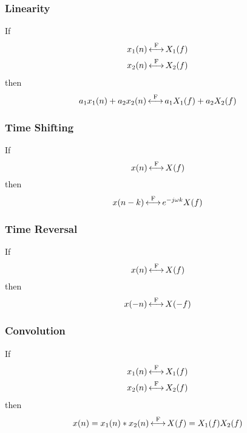 \subsubsection{Linearity}\label{subsubsec:FourierTransformProperties-Linearity}
If
\begin{equation*}
  \begin{aligned}
    x_{1}(n) &\operatorname{\overset{F}{\longleftrightarrow}} X_{1}(f) \\
    x_{2}(n) &\operatorname{\overset{F}{\longleftrightarrow}} X_{2}(f) \\
  \end{aligned}
\end{equation*}
then
\begin{equation}\label{eq:FourierTransformProperties-Linearity}
  a_{1}x_{1}(n) + a_{2}x_{2}(n) \operatorname{\overset{F}{\longleftrightarrow}} a_{1}X_{1}(f) + a_{2}X_{2}(f)
\end{equation}

\subsubsection{Time Shifting}\label{subsubsec:FourierTransformProperties-TimeShifting}
If
\begin{equation*}
  x(n) \operatorname{\overset{F}{\longleftrightarrow}} X(f)
\end{equation*}
then
\begin{equation}\label{eq:FourierTransformProperties-TimeShifting}
  x(n-k) \operatorname{\overset{F}{\longleftrightarrow}} e^{-j \omega k} X(f)
\end{equation}

\subsubsection{Time Reversal}\label{subsubsec:FourierTransformProperties-TimeReversal}
If
\begin{equation*}
  x(n) \operatorname{\overset{F}{\longleftrightarrow}} X(f)
\end{equation*}
then
\begin{equation}\label{eq:FourierTransformProperties-TimeReversal}
  x(-n) \operatorname{\overset{F}{\longleftrightarrow}} X(-f)
\end{equation}

\subsubsection{Convolution}\label{subsubsec:FourierTransformProperties-Convolution}
If
\begin{equation*}
  \begin{aligned}
    x_{1}(n) &\operatorname{\overset{F}{\longleftrightarrow}} X_{1}(f) \\
    x_{2}(n) &\operatorname{\overset{F}{\longleftrightarrow}} X_{2}(f) \\
  \end{aligned}
\end{equation*}
then
\begin{equation}\label{eq:FourierTransformProperties-Convolution}
  x(n) = x_{1}(n) * x_{2}(n) \operatorname{\overset{F}{\longleftrightarrow}} X(f) = X_{1}(f)X_{2}(f)
\end{equation}

